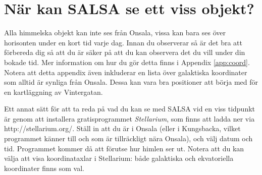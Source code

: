 %

\section{När kan SALSA se ett viss objekt?}
Alla himmelska objekt kan inte ses från Onsala, vissa kan bara ses över horisonten
under en kort tid varje dag. Innan du observerar så är det bra att förbereda dig
så att du är säker på att du kan observera det du vill under din bokade tid.
Mer information om hur du gör detta finns i Appendix \ref{app:coord}. Notera att
detta appendix även inkluderar en lista över galaktiska koordinater som alltid
är synliga från Onsala. Dessa kan vara bra positioner att börja med för en 
kartläggning av Vintergatan.

Ett annat sätt för att ta reda på vad du kan se med SALSA vid en viss tidpunkt
är genom att installera gratisprogrammet \emph{Stellarium}, som finns att 
ladda ner via http://stellarium.org/. Ställ in att du är i Onsala (eller i 
Kungsbacka, vilket programmet känner till och som är tillräckligt nära Onsala),
och välj datum och tid. Programmet kommer då att förutse hur himlen ser ut. 
Notera att du kan välja att visa koordinataxlar i Stellarium: både galaktiska
och ekvatoriella koordinater finns som val.

